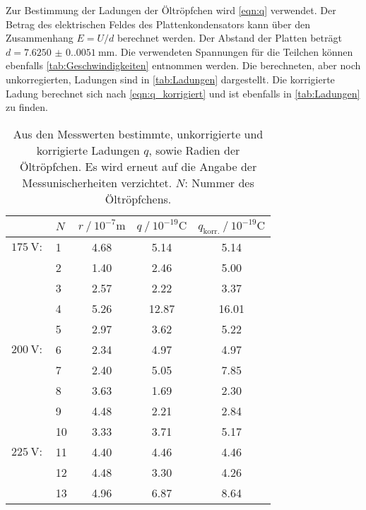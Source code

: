 Zur Bestimmung der Ladungen der Öltröpfchen wird \autoref{eqn:q} verwendet.
Der Betrag des elektrischen Feldes des Plattenkondensators kann über den Zusammenhang $E = U/d$ berechnet werden. Der Abstand der Platten beträgt $d = \qty{7.6250(0.0051)}{\milli\metre}$.
Die verwendeten Spannungen für die Teilchen können ebenfalls \autoref{tab:Geschwindigkeiten} entnommen werden. Die berechneten,
aber noch unkorregierten, Ladungen sind in \autoref{tab:Ladungen} dargestellt. Die korrigierte Ladung berechnet sich nach \autoref{eqn:q_korrigiert} und ist ebenfalls in
\autoref{tab:Ladungen} zu finden.

\begin{table}
    \centering
    \caption{Aus den Messwerten bestimmte, unkorrigierte und korrigierte Ladungen $q$, sowie Radien der Öltröpfchen. Es wird erneut auf die Angabe der 
            Messunischerheiten verzichtet. $N$: Nummer des Öltröpfchens.}
    \label{tab:Ladungen}
    \begin{tabular}{c l S[table-format = 1.2] S[table-format = 2.2] S}
      \toprule
        {} & {$N$} & {$r \mathbin{/} 10^{-7} \unit{\metre}$} & {$q \mathbin{/} {10}^{-19} \unit{\coulomb}$} & {$q_\text{korr.} \mathbin{/} {10}^{-19} \unit{\coulomb}$} \\
        \midrule
        {$\qty{175}{\volt}:$} &  {1} & 4.68 &  5.14 &  5.14 \\
        {                   } &  {2} & 1.40 &  2.46 &  5.00 \\
        {                   } &  {3} & 2.57 &  2.22 &  3.37 \\
        {                   } &  {4} & 5.26 & 12.87 & 16.01 \\
        {                   } &  {5} & 2.97 &  3.62 &  5.22 \\
        {$\qty{200}{\volt}:$} &  {6} & 2.34 &  4.97 &  4.97 \\
        {                   } &  {7} & 2.40 &  5.05 &  7.85 \\
        {                   } &  {8} & 3.63 &  1.69 &  2.30 \\
        {                   } &  {9} & 4.48 &  2.21 &  2.84 \\
        {                   } & {10} & 3.33 &  3.71 &  5.17 \\
        {$\qty{225}{\volt}:$} & {11} & 4.40 &  4.46 &  4.46 \\
        {                   } & {12} & 4.48 &  3.30 &  4.26 \\
        {                   } & {13} & 4.96 &  6.87 &  8.64 \\

\end{tabular}
\end{table}
